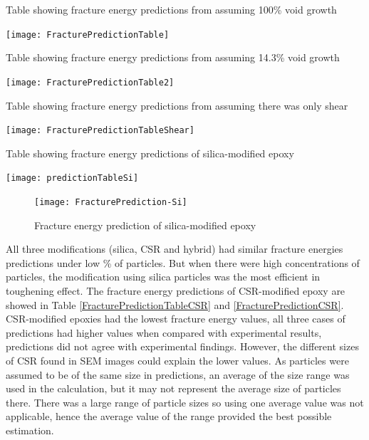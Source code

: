 \documentclass[numbers=noendperiod,chapterprefix=on]{icldt} %
\begin{document}
\begin{table}[!htpb]
\centering
\caption{Table showing fracture energy predictions from assuming 100\% void growth} \label{FracturePredictionTable}
\texttt{[image: FracturePredictionTable]}
\end{table}
\FloatBarrier

\begin{table}[!htpb]
\centering
\caption{Table showing fracture energy predictions from assuming 14.3\% void growth} \label{FracturePredictionTable2}
\texttt{[image: FracturePredictionTable2]}
\end{table}
\FloatBarrier

\begin{table}[!htpb]
\centering
\caption{Table showing fracture energy predictions from assuming there was only shear} \label{FracturePredictionTableShear}
\texttt{[image: FracturePredictionTableShear]}
\end{table}
\FloatBarrier

\begin{table}[!htpb]
\centering
\caption{Table showing fracture energy predictions of silica-modified epoxy} \label{predictionTableSi}
\texttt{[image: predictionTableSi]}
\end{table}
\FloatBarrier

\begin{figure}[!htpb]
\centering
\texttt{[image: FracturePrediction-Si]}
\caption{Fracture energy prediction of silica-modified epoxy} \label{FracturePrediction-Si}
\end{figure}
\FloatBarrier

All three modifications (silica, CSR and hybrid) had similar fracture energies predictions under low \% of particles. But when there were high concentrations of particles, the modification using silica particles was the most efficient in toughening effect. 
The fracture energy predictions of CSR-modified epoxy are showed in Table \ref{FracturePredictionTableCSR} and \ref{FracturePredictionCSR}. CSR-modified epoxies had the lowest fracture energy values, all three cases of predictions had higher values when compared with experimental results, predictions did not agree with experimental findings. However, the different sizes of CSR found in SEM images could explain the lower values. As particles were assumed to be of the same size in predictions, an average of the size range was used in the calculation, but it may not represent the average size of particles there. There was a large range of particle sizes so using one average value was not applicable, hence the average value of the range provided the best possible estimation.
\end{document}
